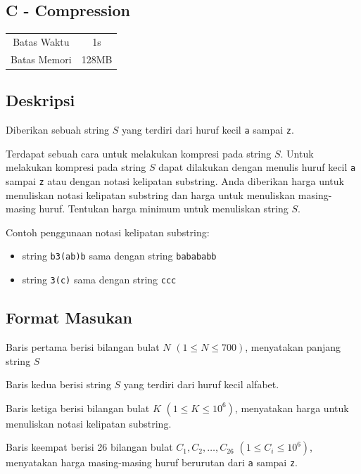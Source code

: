\documentclass{article}
\begin{document}
\begin{center}
    \section*{C - Compression} %

    \begin{tabular}{ | c c | }
        \hline
        Batas Waktu  & 1s \\    %
        Batas Memori & 128MB \\  %
        \hline
    \end{tabular}
\end{center}

\subsection*{Deskripsi}
Diberikan sebuah string $S$ yang terdiri dari huruf kecil \lstinline|a| sampai \lstinline|z|.

Terdapat sebuah cara untuk melakukan kompresi pada string $S$. Untuk melakukan kompresi pada string $S$ dapat dilakukan dengan menulis huruf kecil \lstinline|a| sampai \lstinline|z|  atau dengan notasi kelipatan substring. Anda diberikan harga untuk menuliskan notasi kelipatan substring dan harga untuk menuliskan masing-masing huruf. Tentukan harga minimum untuk menuliskan string $S$.

Contoh penggunaan notasi kelipatan substring:
\begin{itemize}
\item string \lstinline|b3(ab)b| sama dengan string \lstinline|babababb|
\item string \lstinline|3(c)| sama dengan string \lstinline|ccc|
\end{itemize}

\subsection*{Format Masukan}
Baris pertama berisi bilangan bulat $N$ $(1 \leq N \leq 700)$, menyatakan panjang string $S$

Baris kedua berisi string $S$ yang terdiri dari huruf kecil alfabet.

Baris ketiga berisi bilangan bulat $K$ $(1 \leq K \leq 10^6)$, menyatakan harga untuk menuliskan notasi kelipatan substring.

Baris keempat berisi 26 bilangan bulat $C_1, C_2, \dots, C_{26}$ $(1 \leq C_i \leq 10^6)$, menyatakan harga masing-masing huruf berurutan dari \lstinline|a| sampai \lstinline|z|.
\end{document}
